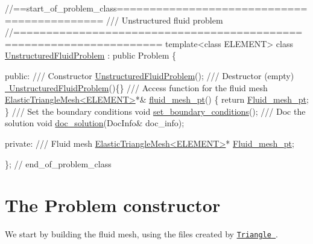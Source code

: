  
\begin{DoxyCodeInclude}
\textcolor{comment}{//==start\_of\_problem\_class============================================}
\textcolor{comment}{/// Unstructured fluid problem}
\textcolor{comment}{}\textcolor{comment}{//====================================================================}
\textcolor{keyword}{template}<\textcolor{keyword}{class} ELEMENT>
\textcolor{keyword}{class }\hyperlink{classUnstructuredFluidProblem}{UnstructuredFluidProblem} : \textcolor{keyword}{public} Problem
\{

\textcolor{keyword}{public}:
\textcolor{comment}{}
\textcolor{comment}{ /// Constructor }
\textcolor{comment}{} \hyperlink{classUnstructuredFluidProblem_a9751f4afac540e148b3d90ae43dd5187}{UnstructuredFluidProblem}();
 \textcolor{comment}{}
\textcolor{comment}{ /// Destructor (empty)}
\textcolor{comment}{} \hyperlink{classUnstructuredFluidProblem_a4d660faa6bae35197a4ea73139ac9963}{~UnstructuredFluidProblem}()\{\}
\textcolor{comment}{}
\textcolor{comment}{ /// Access function for the fluid mesh}
\textcolor{comment}{} \hyperlink{classElasticTriangleMesh}{ElasticTriangleMesh<ELEMENT>}*& \hyperlink{classUnstructuredFluidProblem_abc5f7e9929eb6f174eaa49a491489ad9}{fluid\_mesh\_pt}() 
  \{
   \textcolor{keywordflow}{return} \hyperlink{classUnstructuredFluidProblem_a9b653c3879c846b412068d03bfe8c202}{Fluid\_mesh\_pt};
  \}
\textcolor{comment}{}
\textcolor{comment}{ /// Set the boundary conditions}
\textcolor{comment}{} \textcolor{keywordtype}{void} \hyperlink{classUnstructuredFluidProblem_a4e57ba31d35b62c9c657c1cfd822ecde}{set\_boundary\_conditions}();
\textcolor{comment}{}
\textcolor{comment}{ /// Doc the solution}
\textcolor{comment}{} \textcolor{keywordtype}{void} \hyperlink{classUnstructuredFluidProblem_abcc9f0065665ae5239988b1a812e3f78}{doc\_solution}(DocInfo& doc\_info);

\textcolor{keyword}{private}:
\textcolor{comment}{}
\textcolor{comment}{ /// Fluid mesh}
\textcolor{comment}{} \hyperlink{classElasticTriangleMesh}{ElasticTriangleMesh<ELEMENT>}* \hyperlink{classUnstructuredFluidProblem_a9b653c3879c846b412068d03bfe8c202}{Fluid\_mesh\_pt};


\}; \textcolor{comment}{// end\_of\_problem\_class}

\end{DoxyCodeInclude}




 

\hypertarget{index_constructor}{}\section{The Problem constructor}\label{index_constructor}
We start by building the fluid mesh, using the files created by \href{http://www.cs.cmu.edu/~quake/triangle.html}{\tt {\ttfamily Triangle} }.


